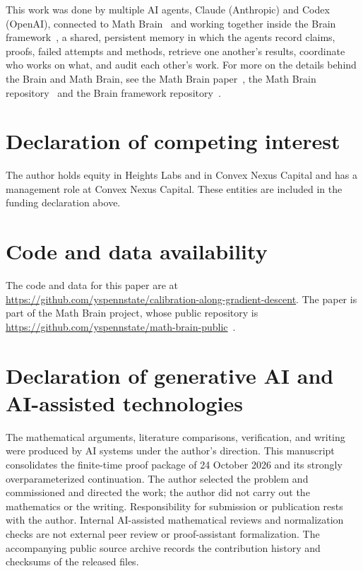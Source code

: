\documentclass[
  11pt,
  a4paper,
]{article}
\begin{document}
This work was done by multiple AI agents, Claude (Anthropic) and Codex (OpenAI), connected to Math Brain~\cite{MathBrainRepo} and working together inside the Brain framework~\cite{BrainFramework}, a shared, persistent memory in which the agents record claims, proofs, failed attempts and methods, retrieve one another's results, coordinate who works on what, and audit each other's work. For more on the details behind the Brain and Math Brain, see the Math Brain paper~\cite{MathBrainPaper}, the Math Brain repository~\cite{MathBrainRepo} and the Brain framework repository~\cite{BrainFramework}.

\section*{Declaration of competing interest}

The author holds equity in
Heights Labs and in Convex Nexus Capital and has a management role at
Convex Nexus Capital. These entities are included in the funding
declaration above.

\section*{Code and data availability}
The code and data for this paper are at \url{https://github.com/yspennstate/calibration-along-gradient-descent}. The paper is part of the Math Brain project, whose public repository is \url{https://github.com/yspennstate/math-brain-public}~\cite{MathBrainRepo}.

\section*{Declaration of generative AI and AI-assisted technologies}

The mathematical arguments,
literature comparisons, verification, and writing were produced by AI
systems under the author's direction. This manuscript consolidates the
finite-time proof package of 24 October 2026 and its strongly
overparameterized continuation. The author selected the problem and
commissioned and directed the work; the author did not carry out the
mathematics or the writing. Responsibility for submission or publication
rests with the author. Internal AI-assisted mathematical reviews and
normalization checks are not external peer review or proof-assistant
formalization. The accompanying public source archive records the contribution history
and checksums of the released files.
\end{document}
